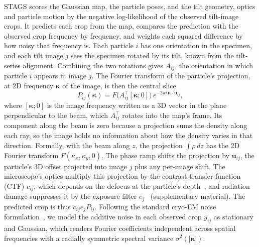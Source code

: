STAGS scores the Gaussian map, the particle poses, and the tilt geometry, optics and particle motion by the negative log-likelihood of the observed tilt-image crops.
It predicts each crop from the map, compares the prediction with the observed crop frequency by frequency, and weights each squared difference by how noisy that frequency is.
Each particle $i$ has one orientation in the specimen, and each tilt image $j$ sees the specimen rotated by its tilt, known from the tilt-series alignment.
Combining the two rotations gives $A_{ij}$, the orientation in which particle $i$ appears in image $j$.
The Fourier transform of the particle's projection, at 2D frequency $\bm{\kappa}$ of the image, is then the central slice
\begin{equation}
P_{ij}(\bm{\kappa})=F\!\big(A_{ij}^{\top}[\bm{\kappa};0]\big)\,e^{-2\pi i\,\bm{\kappa}\cdot\mathbf{u}_{ij}},
\label{eq:slice}
\end{equation}
where $[\bm{\kappa};0]$ is the image frequency written as a 3D vector in the plane perpendicular to the beam, which $A_{ij}^{\top}$ rotates into the map's frame.
Its component along the beam is zero because a projection sums the density along each ray, so the image holds no information about how the density varies in that direction.
Formally, with the beam along $z$, the projection $\int\rho\,dz$ has the 2D Fourier transform $F(\kappa_x,\kappa_y,0)$.
The phase ramp shifts the projection by $\mathbf{u}_{ij}$, the particle's 3D offset projected into image $j$ plus any per-image shift.
The microscope's optics multiply this projection by the contrast transfer function (CTF) $c_{ij}$, which depends on the defocus at the particle's depth~\cite{burt2024relion5}, and radiation damage suppresses it by the exposure filter $e_j$~\cite{grant2015dose} (supplementary material).%
The predicted crop is thus $c_{ij}e_jP_{ij}$.
Following the standard cryo-EM noise formulation~\cite{scheres2012relion}, we model the additive noise in each observed crop $y_{ij}$ as stationary and Gaussian, which renders Fourier coefficients independent across spatial frequencies with a radially symmetric spectral variance $\sigma^2(|\bm{\kappa}|)$.

